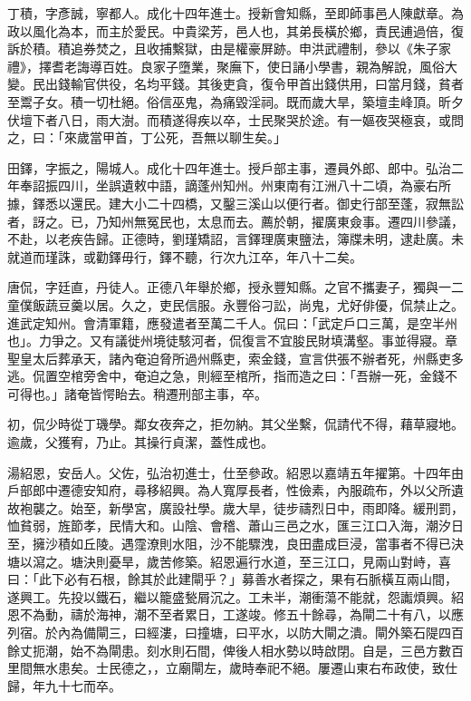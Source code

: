 \begin{pinyinscope}
丁積，字彥誠，寧都人。成化十四年進士。授新會知縣，至即師事邑人陳獻章。為政以風化為本，而主於愛民。中貴梁芳，邑人也，其弟長橫於鄉，責民逋過倍，復訴於積。積追券焚之，且收捕繫獄，由是權豪屏跡。申洪武禮制，參以《朱子家禮》，擇耆老誨導百姓。良家子墮業，聚廡下，使日誦小學書，親為解說，風俗大變。民出錢輸官供役，名均平錢。其後吏貪，復令甲首出錢供用，曰當月錢，貧者至鬻子女。積一切杜絕。俗信巫鬼，為痛毀淫祠。既而歲大旱，築壇圭峰頂。昕夕伏壇下者八日，雨大澍。而積遂得疾以卒，士民聚哭於途。有一嫗夜哭極哀，或問之，曰：「來歲當甲首，丁公死，吾無以聊生矣。」

田鐸，字振之，陽城人。成化十四年進士。授戶部主事，遷員外郎、郎中。弘治二年奉詔振四川，坐誤遺敕中語，謫蓬州知州。州東南有江洲八十二頃，為豪右所據，鐸悉以還民。建大小二十四橋，又鑿三溪山以便行者。御史行部至蓬，寂無訟者，訝之。已，乃知州無冤民也，太息而去。薦於朝，擢廣東僉事。遷四川參議，不赴，以老疾告歸。正德時，劉瑾矯詔，言鐸理廣東鹽法，簿牒未明，逮赴廣。未就道而瑾誅，或勸鐸毋行，鐸不聽，行次九江卒，年八十二矣。

唐侃，字廷直，丹徒人。正德八年舉於鄉，授永豐知縣。之官不攜妻子，獨與一二童僕飯蔬豆羹以居。久之，吏民信服。永豐俗刁訟，尚鬼，尤好俳優，侃禁止之。進武定知州。會清軍籍，應發遣者至萬二千人。侃曰：「武定戶口三萬，是空半州也」。力爭之。又有議徙州境徒駭河者，侃復言不宜朘民財填溝壑。事並得寢。章聖皇太后葬承天，諸內奄迫脅所過州縣吏，索金錢，宣言供張不辦者死，州縣吏多逃。侃置空棺旁舍中，奄迫之急，則經至棺所，指而造之曰：「吾辦一死，金錢不可得也。」諸奄皆愕眙去。稍遷刑部主事，卒。

初，侃少時從丁璣學。鄰女夜奔之，拒勿納。其父坐繫，侃請代不得，藉草寢地。逾歲，父獲宥，乃止。其操行貞潔，蓋性成也。

湯紹恩，安岳人。父佐，弘治初進士，仕至參政。紹恩以嘉靖五年擢第。十四年由戶部郎中遷德安知府，尋移紹興。為人寬厚長者，性儉素，內服疏布，外以父所遺故袍襲之。始至，新學宮，廣設社學。歲大旱，徒步禱烈日中，雨即降。緩刑罰，恤貧弱，旌節孝，民情大和。山陰、會稽、蕭山三邑之水，匯三江口入海，潮汐日至，擁沙積如丘陵。遇霪潦則水阻，沙不能驟洩，良田盡成巨浸，當事者不得已決塘以瀉之。塘決則憂旱，歲苦修築。紹恩遍行水道，至三江口，見兩山對峙，喜曰：「此下必有石根，餘其於此建閘乎？」募善水者探之，果有石脈橫互兩山間，遂興工。先投以鐵石，繼以籠盛甃屑沉之。工未半，潮衝蕩不能就，怨讟煩興。紹恩不為動，禱於海神，潮不至者累日，工遂竣。修五十餘尋，為閘二十有八，以應列宿。於內為備閘三，曰經漊，曰撞塘，曰平水，以防大閘之潰。閘外築石隄四百餘丈扼潮，始不為閘患。刻水則石間，俾後人相水勢以時啟閉。自是，三邑方數百里間無水患矣。士民德之，，立廟閘左，歲時奉祀不絕。屢遷山東右布政使，致仕歸，年九十七而卒。


\end{pinyinscope}
